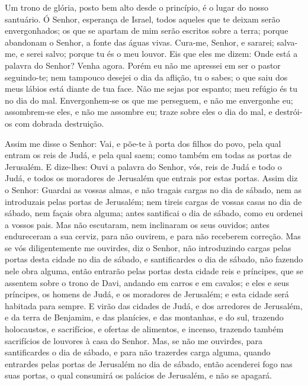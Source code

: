 Um trono de glória, posto bem alto desde o princípio, é o lugar
do nosso santuário. Ó Senhor, esperança de Israel, todos
aqueles que te deixam serão envergonhados; os que se apartam de mim
serão escritos sobre a terra; porque abandonam o Senhor, a fonte das
águas vivas. Cura-me, Senhor, e sararei; salva-me, e serei
salvo; porque tu és o meu louvor. Eis que eles me dizem: Onde
está a palavra do Senhor? Venha agora. Porém eu não me
apressei em ser o pastor seguindo-te; nem tampouco desejei o dia da
aflição, tu o sabes; o que saiu dos meus lábios está diante de tua
face. Não me sejas por espanto; meu refúgio és tu no dia do
mal. Envergonhem-se os que me perseguem, e não me envergonhe
eu; assombrem-se eles, e não me assombre eu; traze sobre eles o dia
do mal, e destrói-os com dobrada destruição.

Assim me disse o Senhor: Vai, e põe-te à porta dos filhos do
povo, pela qual entram os reis de Judá, e pela qual saem; como
também em todas as portas de Jerusalém. E dize-lhes: Ouvi a
palavra do Senhor, vós, reis de Judá e todo o Judá, e todos os
moradores de Jerusalém que entrais por estas portas. Assim
diz o Senhor: Guardai as vossas almas, e não tragais cargas no dia
de sábado, nem as introduzais pelas portas de Jerusalém; nem
tireis cargas de vossas casas no dia de sábado, nem façais obra
alguma; antes santificai o dia de sábado, como eu ordenei a vossos
pais. Mas não escutaram, nem inclinaram os seus ouvidos;
antes endureceram a sua cerviz, para não ouvirem, e para não
receberem correção. Mas se vós diligentemente me ouvirdes,
diz o Senhor, não introduzindo cargas pelas portas desta cidade no
dia de sábado, e santificardes o dia de sábado, não fazendo nele
obra alguma, então entrarão pelas portas desta cidade reis e
príncipes, que se assentem sobre o trono de Davi, andando em carros
e em cavalos; e eles e seus príncipes, os homens de Judá, e os
moradores de Jerusalém; e esta cidade será habitada para sempre.
E virão das cidades de Judá, e dos arredores de Jerusalém, e
da terra de Benjamim, e das planícies, e das montanhas, e do sul,
trazendo holocaustos, e sacrifícios, e ofertas de alimentos, e
incenso, trazendo também sacrifícios de louvores à casa do Senhor.
Mas, se não me ouvirdes, para santificardes o dia de sábado,
e para não trazerdes carga alguma, quando entrardes pelas portas de
Jerusalém no dia de sábado, então acenderei fogo nas suas portas, o
qual consumirá os palácios de Jerusalém, e não se apagará.

\medskip

